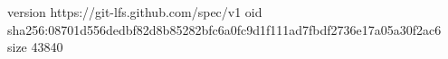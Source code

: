 version https://git-lfs.github.com/spec/v1
oid sha256:08701d556dedbf82d8b85282bfc6a0fc9d1f111ad7fbdf2736e17a05a30f2ac6
size 43840
